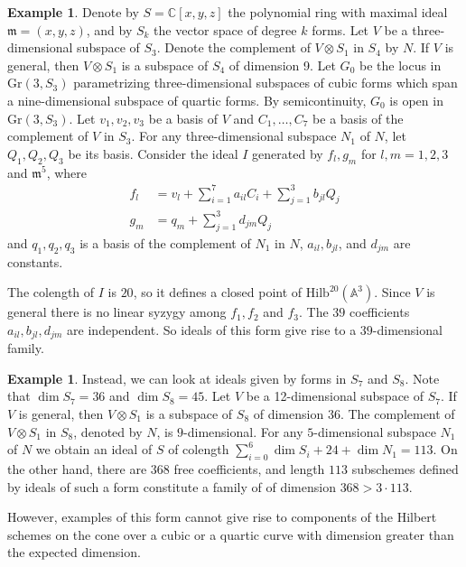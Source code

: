 \documentclass[12pt,oneside,reqno]{amsart}
\theoremstyle{definition}
\newtheorem{eg}[theorem]{Example}
\begin{document}
\begin{eg}
Denote by $S = \mathbb{C}[x, y, z]$ the polynomial ring with maximal ideal $\mathfrak{m} = (x, y, z)$, and by $S_k$ the vector space of degree $k$ forms. Let $V$ be a three-dimensional subspace of $S_3$. Denote the complement of $V \otimes S_1$ in $S_4$ by $N$. If $V$ is general, then $V \otimes S_1$ is a subspace of $S_4$ of dimension 9. Let $G_0$ be the locus in $\mathrm{Gr}(3, S_3)$ parametrizing three-dimensional subspaces of cubic forms which span a nine-dimensional subspace of quartic forms. By semicontinuity, $G_0$ is open in $\mathrm{Gr}(3, S_3)$. Let $v_1, v_2, v_3$ be a basis of $V$ and $C_1, \dots, C_7$ be a basis of the complement of $V$ in $S_3$. For any three-dimensional subspace $N_1$ of $N$, let $Q_1, Q_2, Q_3$ be its basis. Consider the ideal $I$ generated by $f_l, g_m$ for $l, m = 1, 2, 3$ and $\mathfrak{m}^5$, where 
\begin{align*}
f_l & = v_l + \sum_{i = 1}^7a_{il}C_i + \sum_{j = 1}^3b_{jl}Q_j \\
g_m & = q_m + \sum_{j = 1}^3d_{jm}Q_j 
\end{align*} 
and $q_1, q_2, q_3$ is a basis of the complement of $N_1$ in $N$, $a_{il}, b_{jl}$, and $d_{jm}$ are constants.

The colength of $I$ is $20$, so it defines a closed point of $\mathrm{Hilb}^{20}(\mathbb{A}^3)$. Since $V$ is general there is no linear syzygy among $f_1, f_2$ and $f_3$. The $39$ coefficients $a_{il}, b_{jl}, d_{jm}$ are independent. So ideals of this form give rise to a $39$-dimensional family. 
\end{eg}

\begin{eg}
Instead, we can look at ideals given by forms in $S_{7}$ and $S_8$. Note that $\dim S_7 = 36$ and $\dim S_8 = 45$. Let $V$ be a 12-dimensional subspace of $S_7$. If $V$ is general, then $V \otimes S_1$ is a subspace of $S_8$ of dimension $36$. The complement of $V \otimes S_1$ in $S_8$, denoted by $N$, is $9$-dimensional. For any $5$-dimensional subspace $N_1$ of $N$ we obtain an ideal of $S$ of colength $\sum_{i = 0}^6 \dim S_i + 24 + \dim N_1 = 113$. On the other hand, there are $368$ free coefficients, and length $113$ subschemes defined by ideals of such a form constitute a family of of dimension $368 > 3 \cdot 113$.
\end{eg}

However, examples of this form cannot give rise to components of the Hilbert schemes on the cone over a cubic or a quartic curve with dimension greater than the expected dimension. 
\end{document}

